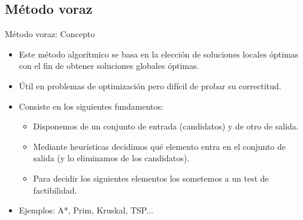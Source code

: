 \documentclass[10pt,handout]{beamer}
\begin{document}
\subsection{Método voraz}
\begin{frame}{Método voraz: Concepto}
  \begin{itemize}
  \item Este método algorítmico se basa en la elección de soluciones locales óptimas
    con el fin de obtener soluciones globales óptimas. \pause
  \item Útil en problemas de optimización pero difícil de probar su correctitud. \pause
  \item Consiste en los siguientes fundamentos: \pause
    \begin{itemize}
    \item Disponemos de un conjunto de entrada (candidatos) y de otro de salida. \pause
    \item Mediante heurísticas decidimos qué elemento entra en el conjunto de salida
      (y lo eliminamos de los candidatos). \pause
    \item Para decidir los siguientes elementos los sometemos a un test de factibilidad. \pause
    \end{itemize}
  \item Ejemplos: A*, Prim, Kruskal, TSP...
  \end{itemize}
\end{frame}
\end{document}
